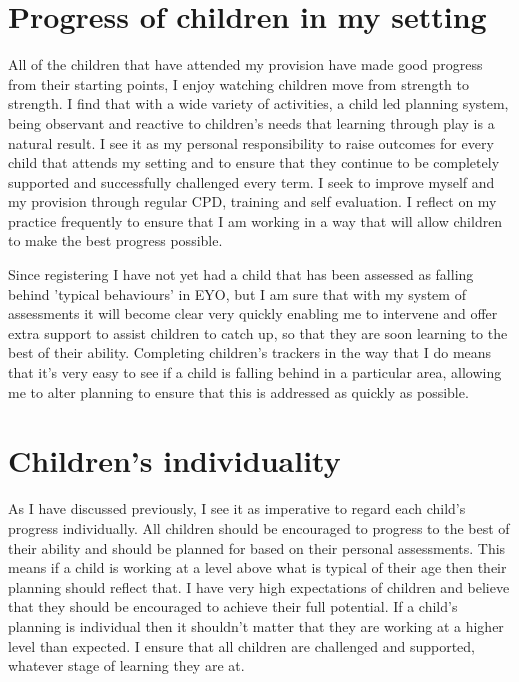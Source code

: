 \documentclass[10pt,a4paper]{report}
\makeatletter
\newcommand{\DESCRIPTION@original@item}{}
\let\DESCRIPTION@original@item\item
\newcommand*{\DESCRIPTION@envir}{DESCRIPTION}
\newlength{\DESCRIPTION@totalleftmargin}
\newlength{\DESCRIPTION@linewidth}
\newcommand{\DESCRIPTION@makelabel}[1]{\llap{#1}}%
\newcommand{\DESCRIPTION@item}[1][]{%
  \setlength{\@totalleftmargin}%
       {\DESCRIPTION@totalleftmargin+\widthof{\textbf{#1 }}-\leftmargin}%
  \setlength{\linewidth}
       {\DESCRIPTION@linewidth-\widthof{\textbf{#1 }}+\leftmargin}%
  \par\parshape \@ne \@totalleftmargin \linewidth
  \DESCRIPTION@original@item[\textbf{#1}]%
}
\newenvironment{DESCRIPTION}
  {\list{}{\setlength{\labelwidth}{0cm}%
           \let\makelabel\DESCRIPTION@makelabel}%
   \setlength{\DESCRIPTION@totalleftmargin}{\@totalleftmargin}%
   \setlength{\DESCRIPTION@linewidth}{\linewidth}%
   \renewcommand{\item}{\ifx\@currenvir\DESCRIPTION@envir
                           \expandafter\DESCRIPTION@item
                        \else
                           \expandafter\DESCRIPTION@original@item
                        \fi}}
  {\endlist}
\makeatother
\begin{document}
\begin{DESCRIPTION}
\begin{DESCRIPTION}
\section{Progress of children in my setting}

All of the children that have attended my provision have made good progress from their starting points, I enjoy watching children move from strength to strength. I find that with a wide variety of activities, a child led planning system, being observant and reactive to children's needs that learning through play is a natural result. I see it as my personal responsibility to raise outcomes for every child that attends my setting and to ensure that they continue to be completely supported and successfully challenged every term. I seek to improve myself and my provision through regular CPD, training and self evaluation. I reflect on my practice frequently to ensure that I am working in a way that will allow children to make the best progress possible. 

Since registering I have not yet had a child that has been assessed as falling behind 'typical behaviours' in EYO, but I am sure that with my system of assessments it will become clear very quickly enabling me to intervene and offer extra support to assist children to catch up, so that they are soon learning to the best of their ability. Completing children's trackers in the way that I do means that it's very easy to see if a child is falling behind in a particular area, allowing me to alter planning to ensure that this is addressed as quickly as possible.

\section{Children's individuality}

As I have discussed previously, I see it as imperative to regard each child's progress individually. All children should be encouraged to progress to the best of their ability and should be planned for based on their personal assessments. This means if a child is working at a level above what is typical of their age then their planning should reflect that. I have very high expectations of children and believe that they should be encouraged to achieve their full potential. If a child's planning is individual then it shouldn't matter that they are working at a higher level than expected. I ensure that all children are challenged and supported, whatever stage of learning they are at.


\end{DESCRIPTION}
\end{DESCRIPTION}
\end{document}
